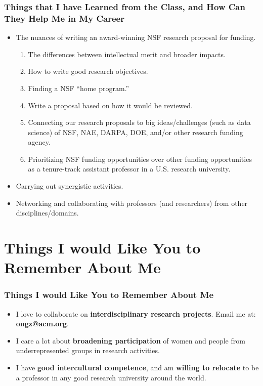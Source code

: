 \documentclass[xcolor={usenames,dvipsnames},hyperref={hyperindex,bookmarks}]{beamer}
\begin{document}
\frame
{
	\frametitle{Things that I have Learned from the Class, and How Can They Help Me in My Career}

	\begin{itemize}
	\item The nuances of writing an award-winning NSF research proposal for funding. %
		\begin{enumerate} %
		\item The differences between intellectual merit and broader impacts.
		\item How to write good research objectives.
		\item Finding a NSF ``home program.''
		\item Write a proposal based on how it would be reviewed.
		\item Connecting our research proposals to big ideas/challenges (such as data science) of NSF, NAE, DARPA, DOE, and/or other research funding agency.
		\item Prioritizing NSF funding opportunities over other funding opportunities as a tenure-track assistant professor in a U.S. research university.
		\end{enumerate}
	\item Carrying out synergistic activities.
	\item Networking and collaborating with professors (and researchers) from other disciplines/domains.
	\end{itemize}
}





\section{Things I would Like You to Remember About Me}

\frame
{
	\frametitle{Things I would Like You to Remember About Me}

	\begin{itemize}
	\item I love to collaborate on {\bf interdisciplinary research projects}. Email me at: {\bf ongz@acm.org}.
	\item I care a lot about {\bf broadening participation} of women and people from underrepresented groups in research activities.
	\item I have {\bf good intercultural competence}, and am {\bf willing to relocate} to be a professor in any good research university around the world.
	\end{itemize}
}
\end{document}
